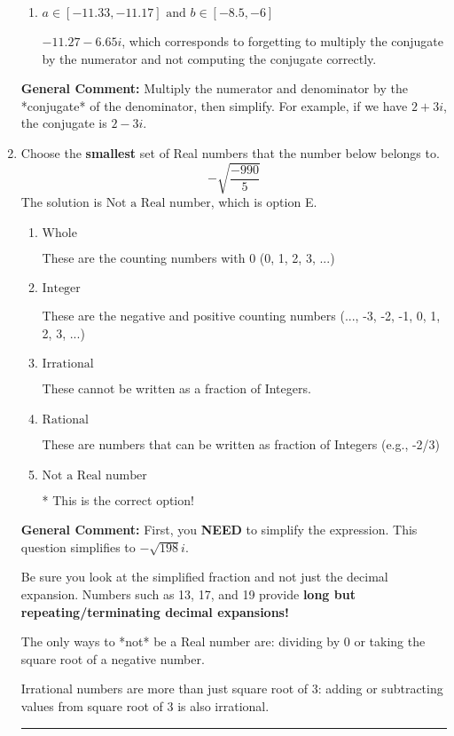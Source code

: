 \documentclass{extbook}[14pt]
\newcommand{\litem}[1]{\item #1

\rule{\textwidth}{0.4pt}}
\begin{document}
\begin{enumerate}
{\begin{enumerate}[label=\Alph*.]
 $-337.00  - 1.81 i$, which corresponds to forgetting to multiply the conjugate by the numerator and using a plus instead of a minus in the denominator.
\item \( a \in [-11.33, -11.17] \text{ and } b \in [-8.5, -6] \)

 $-11.27  - 6.65 i$, which corresponds to forgetting to multiply the conjugate by the numerator and not computing the conjugate correctly.
\end{enumerate}

\textbf{General Comment:} Multiply the numerator and denominator by the *conjugate* of the denominator, then simplify. For example, if we have $2+3i$, the conjugate is $2-3i$.
}
\litem{
Choose the \textbf{smallest} set of Real numbers that the number below belongs to.
\[ -\sqrt{\frac{-990}{5}} \]The solution is \( \text{Not a Real number} \), which is option E.\begin{enumerate}[label=\Alph*.]
\item \( \text{Whole} \)

These are the counting numbers with 0 (0, 1, 2, 3, ...)
\item \( \text{Integer} \)

These are the negative and positive counting numbers (..., -3, -2, -1, 0, 1, 2, 3, ...)
\item \( \text{Irrational} \)

These cannot be written as a fraction of Integers.
\item \( \text{Rational} \)

These are numbers that can be written as fraction of Integers (e.g., -2/3)
\item \( \text{Not a Real number} \)

* This is the correct option!
\end{enumerate}

\textbf{General Comment:} First, you \textbf{NEED} to simplify the expression. This question simplifies to $-\sqrt{198} i$. 
 
 Be sure you look at the simplified fraction and not just the decimal expansion. Numbers such as 13, 17, and 19 provide \textbf{long but repeating/terminating decimal expansions!} 
 
 The only ways to *not* be a Real number are: dividing by 0 or taking the square root of a negative number. 
 
 Irrational numbers are more than just square root of 3: adding or subtracting values from square root of 3 is also irrational.
}
\end{enumerate}
\end{document}
